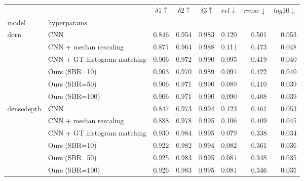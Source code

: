 \begin{tabular}{llrrr|rrr}
\toprule
           &                & $\delta1 \uparrow$ & $\delta2 \uparrow$ & $\delta3 \uparrow$ & $rel \downarrow$ & $rmse \downarrow$ & $log10 \downarrow$ \\
model & hyperparams &                    &                    &                    &                  &                   &                    \\
\midrule
\multirow{6}{*}{dorn} & CNN &              0.846 &              0.954 &              0.983 &            0.120 &             0.501 &              0.053 \\
           & CNN + median rescaling &              0.871 &              0.964 &              0.988 &            0.111 &             0.473 &              0.048 \\
           & CNN + GT histogram matching &              0.906 &              0.972 &              0.990 &            0.095 &             0.419 &              0.040 \\
           & Ours (SBR=10) &              0.903 &              0.970 &              0.989 &            0.091 &             0.422 &              0.040 \\
           & Ours (SBR=50) &              0.906 &              0.971 &              0.990 &            0.089 &             0.410 &              0.039 \\
           & Ours (SBR=100) &              0.906 &              0.971 &              0.990 &            0.090 &             0.408 &              0.039 \\
\cline{1-8}
\multirow{6}{*}{densedepth} & CNN &              0.847 &              0.973 &              0.994 &            0.123 &             0.461 &              0.053 \\
           & CNN + median rescaling &              0.888 &              0.978 &              0.995 &            0.106 &             0.409 &              0.045 \\
           & CNN + GT histogram matching &              0.930 &              0.984 &              0.995 &            0.079 &             0.338 &              0.034 \\
           & Ours (SBR=10) &              0.922 &              0.982 &              0.994 &            0.082 &             0.361 &              0.036 \\
           & Ours (SBR=50) &              0.925 &              0.983 &              0.995 &            0.081 &             0.348 &              0.035 \\
           & Ours (SBR=100) &              0.926 &              0.983 &              0.995 &            0.081 &             0.346 &              0.035 \\
\bottomrule
\end{tabular}

